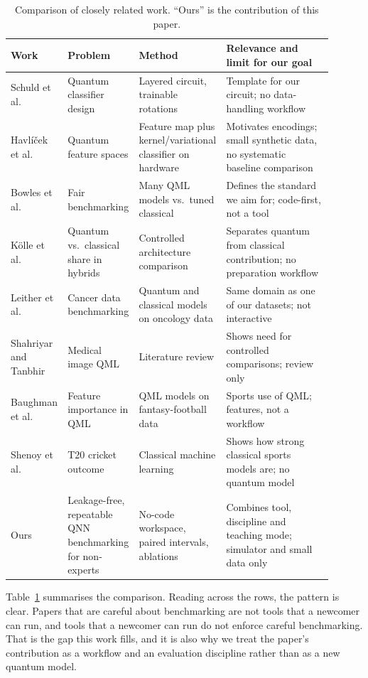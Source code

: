 \documentclass[12pt,onecolumn,draftclsnofoot]{IEEEtran}
\begin{document}
\begin{table}[!t]
\caption{Comparison of closely related work. ``Ours'' is the contribution of this paper.}
\label{tab:related}
\centering\small
\begin{tabular}{p{0.15\linewidth}p{0.20\linewidth}p{0.22\linewidth}p{0.33\linewidth}}
\toprule
Work & Problem & Method & Relevance and limit for our goal\\
\midrule
Schuld et al.~\cite{schuld2020circuit} & Quantum classifier design & Layered circuit, trainable rotations & Template for our circuit; no data-handling workflow\\
Havl\'i\v{c}ek et al.~\cite{havlicek2019supervised} & Quantum feature spaces & Feature map plus kernel/variational classifier on hardware & Motivates encodings; small synthetic data, no systematic baseline comparison\\
Bowles et al.~\cite{bowles2024better} & Fair benchmarking & Many QML models vs.\ tuned classical & Defines the standard we aim for; code-first, not a tool\\
K\"olle et al.~\cite{kolle2023disentangling} & Quantum vs.\ classical share in hybrids & Controlled architecture comparison & Separates quantum from classical contribution; no preparation workflow\\
Leither et al.~\cite{leither2026oncology} & Cancer data benchmarking & Quantum and classical models on oncology data & Same domain as one of our datasets; not interactive\\
Shahriyar and Tanbhir~\cite{shahriyar2025medical} & Medical image QML & Literature review & Shows need for controlled comparisons; review only\\
Baughman et al.~\cite{baughman2022feature} & Feature importance in QML & QML models on fantasy-football data & Sports use of QML; features, not a workflow\\
Shenoy et al.~\cite{shenoy2022t20} & T20 cricket outcome & Classical machine learning & Shows how strong classical sports models are; no quantum model\\
Ours & Leakage-free, repeatable QNN benchmarking for non-experts & No-code workspace, paired intervals, ablations & Combines tool, discipline and teaching mode; simulator and small data only\\
\bottomrule
\end{tabular}
\end{table}

Table~\ref{tab:related} summarises the comparison. Reading across the rows, the pattern is clear. Papers that are careful about benchmarking are not tools that a newcomer can run, and tools that a newcomer can run do not enforce careful benchmarking. That is the gap this work fills, and it is also why we treat the paper's contribution as a workflow and an evaluation discipline rather than as a new quantum model.
\end{document}
